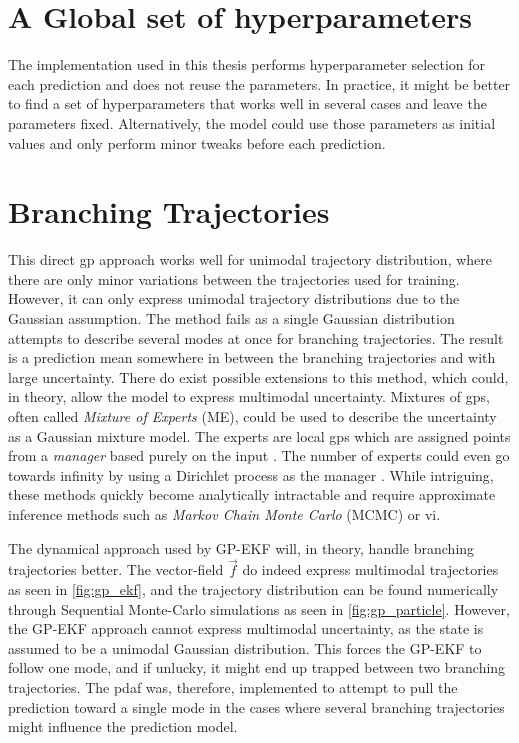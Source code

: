 \section{A Global set of hyperparameters}
The implementation used in this thesis performs hyperparameter selection for each prediction and does not reuse the parameters. In practice, it might be better to find a set of hyperparameters that works well in several cases and leave the parameters fixed. Alternatively, the model could use those parameters as initial values and only perform minor tweaks before each prediction. 

\section{Branching Trajectories}
This direct \acrshort{gp} approach works well for unimodal trajectory distribution, where there are only minor variations between the trajectories used for training. However, it can only express unimodal trajectory distributions due to the Gaussian assumption. The method fails as a single Gaussian distribution attempts to describe several modes at once for branching trajectories. The result is a prediction mean somewhere in between the branching trajectories and with large uncertainty. There do exist possible extensions to this method, which could, in theory, allow the model to express multimodal uncertainty. Mixtures of \acrshort{gp}s, often called \textit{Mixture of Experts} (ME), could be used to describe the uncertainty as a Gaussian mixture model. The experts are local \acrshort{gp}s which are assigned points from a \textit{manager} based purely on the input \cite{rasmussen}. The number of experts could even go towards infinity by using a Dirichlet process as the manager \cite{dirichlet_process_gp}. While intriguing, these methods quickly become analytically intractable and require approximate inference methods such as \textit{Markov Chain Monte Carlo} (MCMC) or \acrshort{vi}. 

The dynamical approach used by GP-EKF will, in theory, handle branching trajectories better. The vector-field $\vec{f}$ do indeed express multimodal trajectories as seen in \cref{fig:gp_ekf}, and the trajectory distribution can be found numerically through Sequential Monte-Carlo simulations as seen in \cref{fig:gp_particle}. However, the GP-EKF approach cannot express multimodal uncertainty, as the state is assumed to be a unimodal Gaussian distribution. This forces the GP-EKF to follow one mode, and if unlucky, it might end up trapped between two branching trajectories. The \acrshort{pdaf} was, therefore, implemented to attempt to pull the prediction toward a single mode in the cases where several branching trajectories might influence the prediction model. 



